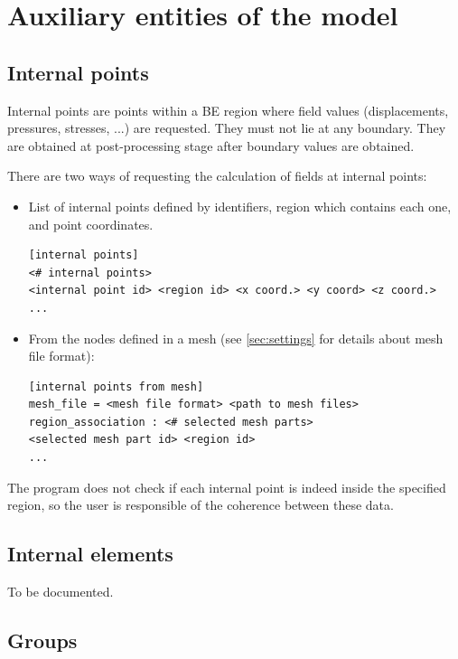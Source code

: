 \documentclass[a4paper,fleqn]{book}
\begin{document}
\section{Auxiliary entities of the model}

\subsection{Internal points}
\label{sec:internal_points}

Internal points are points within a BE region where field values (displacements, pressures, stresses, ...) are requested. They must not lie at any boundary. They are obtained at post-processing stage after boundary values are obtained.

There are two ways of requesting the calculation of fields at internal points:
\begin{itemize}
\item List of internal points defined by identifiers, region which contains each one, and point coordinates. 
\begin{Verbatim}[frame=single, fontsize=\small, label={general format of section [internal points]}]
[internal points]
<# internal points>
<internal point id> <region id> <x coord.> <y coord> <z coord.> 
...
\end{Verbatim}
\item From the nodes defined in a mesh (see \ref{sec:settings} for details about mesh file format):
\begin{Verbatim}[frame=single, fontsize=\small, label={general format of section [internal points from mesh]}]
[internal points from mesh]
mesh_file = <mesh file format> <path to mesh files>
region_association : <# selected mesh parts>
<selected mesh part id> <region id>
...
\end{Verbatim}
\end{itemize}
The program does not check if each internal point is indeed inside the specified region, so the user is responsible of the coherence between these data.

\subsection{Internal elements}
\label{sec:internal_elements}

To be documented.

\subsection{Groups}
\label{sec:groups}
\end{document}
